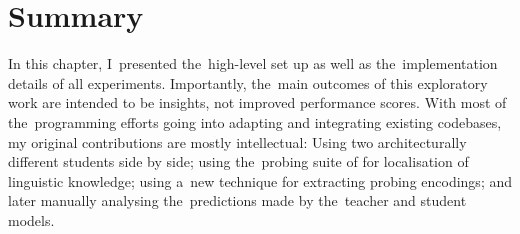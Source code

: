 \documentclass[bsc,frontabs,singlespacing,parskip,deptreport]{infthesis}
\begin{document}
{  \section{Summary}{
    In this chapter, I~presented the~high-level set up as well as the~implementation details of all experiments.
    Importantly, the~main outcomes of this exploratory work are intended to be insights, not improved performance scores.
    With most of the~programming efforts going into adapting and integrating existing codebases, my original contributions are mostly intellectual: 
    Using two architecturally different students side by side; 
    using the~probing suite of \citet{Conneau_2018} for localisation of linguistic knowledge;
    using a~new technique for extracting probing encodings; 
    and later manually analysing the~predictions made by the~teacher and student models.
  }
}
\end{document}
